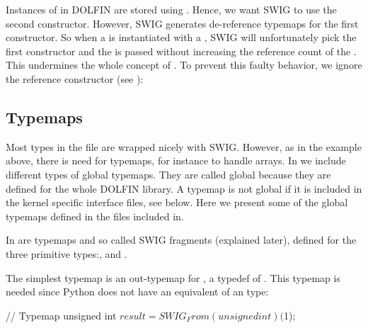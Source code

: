 \vspace*{3pt}

\noindent Instances of  in DOLFIN are stored
using . Hence, we want SWIG to use the second
constructor. However, SWIG generates de-reference typemaps for the
first constructor. So when a  is instantiated with a
, SWIG will unfortunately pick the first constructor
and the  is passed without increasing the reference
count of the .  This undermines the whole concept
of . To prevent this faulty behavior, we ignore the
reference constructor (see ):\vspace*{1.5pt}
\begin{swigcode}
\end{swigcode}

\vspace*{3pt}
\subsection{Typemaps}

Most types in the  file are wrapped nicely with
SWIG. However, as in the  example above, there is need for
typemaps, for instance to handle \numpy arrays. In  we
include different types of global typemaps. They are called global
because they are defined for the whole DOLFIN library. A typemap is
not global if it is included in the kernel specific interface files,
see below. Here we present some of the global typemaps defined in the
files included in\break {}.

In  are typemaps and so called SWIG fragments (explained later), defined
for the three primitive types:,  and
.

\pagebreak

The simplest typemap is an out-typemap for , a
typedef of . This typemap is needed since Python
does not have an equivalent of an  type:\vspace*{3pt}
\begin{swigcode}
{
  // Typemap unsigned int
  $result = SWIG_From(unsigned int)($1);
}
\end{swigcode}


